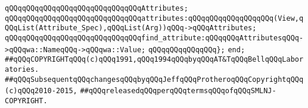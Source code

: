 \verb|qQQqqQQqqQQqqQQqqQQqqQQqqQQqqQQqAttributes;|\newline
\newline
\verb|qQQqqQQqqQQqqQQqqQQqqQQqqQQqqQQqattributes:qQQqqQQqqQQqqQQqqQQq(View,qQQqList(Attribute_Spec),qQQqList(Arg))qQQq->qQQqAttributes;|\newline
\verb|qQQqqQQqqQQqqQQqqQQqqQQqqQQqqQQqfind_attribute:qQQqqQQqAttributesqQQq->qQQqwa::NameqQQq->qQQqwa::Value;|\newline
\verb|qQQqqQQqqQQqqQQq};|\newline
\newline
\verb|end;|\newline
\newline
\newline
\verb|##qQQqCOPYRIGHTqQQq(c)qQQq1991,qQQq1994qQQqbyqQQqAT&TqQQqBellqQQqLaboratories.|\newline
\verb|##qQQqSubsequentqQQqchangesqQQqbyqQQqJeffqQQqProtheroqQQqCopyrightqQQq(c)qQQq2010-2015,|\newline
\verb|##qQQqreleasedqQQqperqQQqtermsqQQqofqQQqSMLNJ-COPYRIGHT.|\newline

